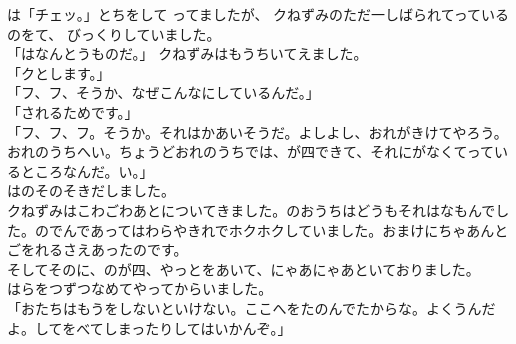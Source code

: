 \documentclass[
    a4paper,
    10pt,
    book]
    {tarticle}
\begin{document}
\noindent {}は「チェッ。」とちをして
ってましたが、
クねずみのただ一しばられてっているのをて、
びっくりしていました。\\
「はなんとうものだ。」
クねずみはもうちいてえました。\\
「クとします。」\\
「フ、フ、そうか、なぜこんなにしているんだ。」\\
「されるためです。」\\
「フ、フ、フ。そうか。それはかあいそうだ。よしよし、おれがきけてやろう。
おれのうちへい。ちょうどおれのうちでは、が四できて、それにがなくてっているところなんだ。い。」\\
\indent {}はのそのそきだしました。\\
\indent クねずみはこわごわあとについてきました。のおうちはどうもそれはなもんでした。のでんであってはわらやきれでホクホクしていました。おまけにちゃあんとごをれるさえあったのです。\\
\indent そしてそのに、のが四、やっとをあいて、にゃあにゃあといておりました。\\
\indent {}はらをつずつなめてやってからいました。\\
「おたちはもうをしないといけない。ここへをたのんでたからな。よくうんだよ。してをべてしまったりしてはいかんぞ。」

\newpage
\thispagestyle{fancy}
\end{document}
